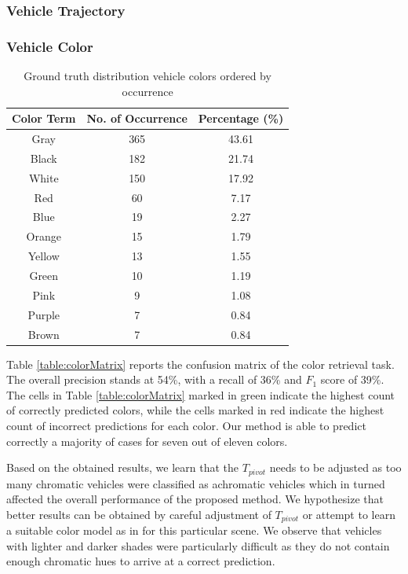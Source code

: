 \subsubsection{Vehicle Trajectory}
\subsubsection{Vehicle Color}

\begin{table}[bht!]
\centering
\caption{Ground truth distribution vehicle colors ordered by occurrence}
\label{table:colorDist}
\begin{tabular}{ccc}
\toprule
Color Term & No. of Occurrence & Percentage (\%)   \\
\midrule
Gray       & 365       & 43.61  \\
Black      & 182       & 21.74  \\
White      & 150       & 17.92  \\
Red        & 60        & 7.17   \\
Blue       & 19        & 2.27   \\
Orange     & 15        & 1.79   \\
Yellow     & 13        & 1.55   \\
Green      & 10        & 1.19   \\
Pink       & 9         & 1.08   \\
Purple     & 7         & 0.84   \\
Brown      & 7         & 0.84   \\
\bottomrule
\end{tabular}
\end{table}


Table \ref{table:colorMatrix} reports the confusion matrix of the color retrieval task. 
The overall precision stands at 54\%, with a recall of 36\% and $F_1$ score of 39\%. The cells in Table \ref{table:colorMatrix} marked in green indicate the highest count of correctly predicted colors, while the cells marked in red indicate the highest count of incorrect predictions for each color. Our method is able to predict correctly a majority of cases for seven out of eleven colors.

Based on the obtained results, we learn that the $T_{pivot}$ needs to be adjusted as too many chromatic vehicles were classified as achromatic vehicles which in turned affected the overall performance of the proposed method. We hypothesize that better results can be obtained by careful adjustment of $T_{pivot}$ or attempt to learn a suitable color model as in \cite{hu2015vehicle,rachmadi2015vehicle} for this particular scene. We observe that vehicles with lighter and darker shades were particularly difficult as they do not contain enough chromatic hues to arrive at a correct prediction.  

